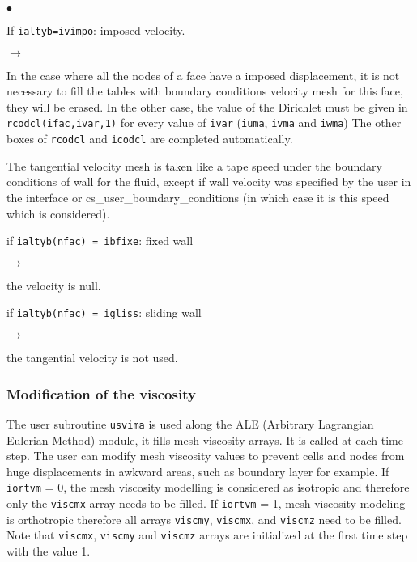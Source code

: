 {{{{\begin{list}{$\bullet$}{}

\item If \texttt{ialtyb=ivimpo}: imposed velocity.

\begin{list}{$\rightarrow$}{}
\item In the case where all the nodes of a face have a imposed displacement,
 it is not necessary to fill the tables with boundary conditions
 velocity mesh for this face, they will be erased. In the other case,
 the value of the Dirichlet must be given in \texttt{rcodcl(ifac,ivar,1)} for
 every value of \texttt{ivar} (\texttt{iuma}, \texttt{ivma} and \texttt{iwma})
 The other boxes of \texttt{rcodcl} and \texttt{icodcl} are completed automatically.

 The tangential velocity mesh is taken like a tape speed under the
 boundary conditions of wall for the fluid, except if wall velocity
 was specified by the user in the interface or cs\_user\_boundary\_conditions (in which case
 it is this speed which is considered).
\end{list}

 \item if \texttt{ialtyb(nfac) = ibfixe}: fixed wall
\begin{list}{$\rightarrow$}{}
 \item the velocity is null.
\end{list}

 \item if \texttt{ialtyb(nfac) = igliss}:  sliding wall
\begin{list}{$\rightarrow$}{}
\item the tangential velocity is not used.
\end{list}

\end{list}
}

\subsubsection{Modification of the viscosity}

The user subroutine \texttt{usvima} is used along the ALE (Arbitrary Lagrangian Eulerian
 Method) module, it fills mesh viscosity arrays. It is called at each time step.
The user can modify mesh viscosity values to prevent cells and nodes from huge
 displacements in awkward areas, such as boundary layer for example.
If \texttt{iortvm} = 0, the mesh viscosity modelling is considered as isotropic and
 therefore only the \texttt{viscmx} array needs to be filled.
If \texttt{iortvm} = 1, mesh viscosity modeling is orthotropic therefore all arrays
 \texttt{viscmy}, \texttt{viscmx}, and \texttt{viscmz} need to be filled.
Note that \texttt{viscmx}, \texttt{viscmy} and \texttt{viscmz} arrays are initialized
 at the first time step with the value 1.

}}}
